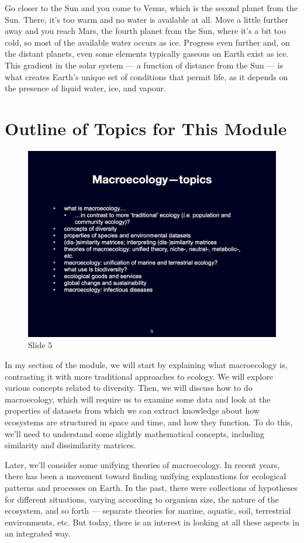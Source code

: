 \documentclass[
  12pt,
]{book}
\begin{document}
Go closer to the Sun and you come to Venus, which is the second planet
from the Sun. There, it's too warm and no water is available at all.
Move a little further away and you reach Mars, the fourth planet from
the Sun, where it's a bit too cold, so most of the available water
occurs as ice. Progress even further and, on the distant planets, even
some elements typically gaseous on Earth exist as ice. This gradient in
the solar system --- a function of distance from the Sun --- is what
creates Earth's unique set of conditions that permit life, as it depends
on the presence of liquid water, ice, and vapour.

\section{Outline of Topics for This
Module}\label{outline-of-topics-for-this-module}

\begin{figure}[ht]
\centering
\includegraphics[width=0.8\linewidth]{../images/BDC334/BDC334-005.jpeg}
\caption*{Slide 5}
\end{figure}

In my section of the module, we will start by explaining what
macroecology is, contrasting it with more traditional approaches to
ecology. We will explore various concepts related to diversity. Then, we
will discuss how to do macroecology, which will require us to examine
some data and look at the properties of datasets from which we can
extract knowledge about how ecosystems are structured in space and time,
and how they function. To do this, we'll need to understand some
slightly mathematical concepts, including similarity and dissimilarity
matrices.

Later, we'll consider some unifying theories of macroecology. In recent
years, there has been a movement toward finding unifying explanations
for ecological patterns and processes on Earth. In the past, there were
collections of hypotheses for different situations, varying according to
organism size, the nature of the ecosystem, and so forth --- separate
theories for marine, aquatic, soil, terrestrial environments, etc. But
today, there is an interest in looking at all these aspects in an
integrated way.
\end{document}
